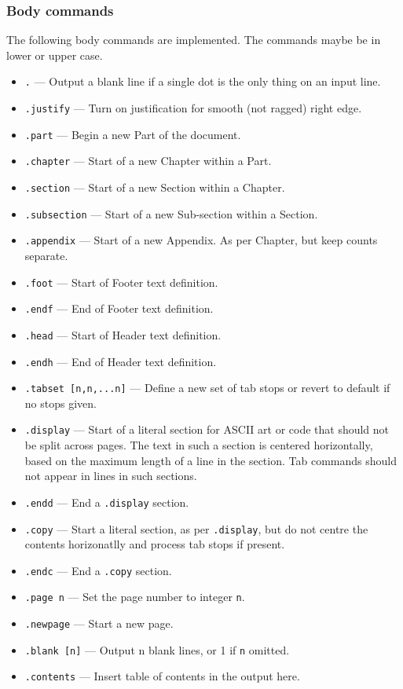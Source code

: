 \documentclass[a4paper,twoside,11pt]{article}
\newcommand{\textttc}[1]{\texttt{\textcolor{OurRed}{#1}}}
\begin{document}
\subsubsection{Body commands}
The following body commands are implemented. The commands maybe be in lower or upper case.
\begin{itemize}
\item \textttc{.} --- Output a blank line if a single dot is the only thing on an input line.
\item \textttc{.justify} --- Turn on justification for smooth (not ragged) right edge.
\item \textttc{.part} --- Begin a new Part of the document.
\item \textttc{.chapter} --- Start of a new Chapter within a Part.
\item \textttc{.section} --- Start of a new Section within a Chapter.
\item \textttc{.subsection} --- Start of a new Sub-section within a Section.
\item \textttc{.appendix} --- Start of a new Appendix. As per Chapter, but keep counts separate.
\item \textttc{.foot} --- Start of Footer text definition.
\item \textttc{.endf} --- End of Footer text definition.
\item \textttc{.head} --- Start of Header text definition.
\item \textttc{.endh} --- End of Header text definition.
\item \textttc{.tabset [n,n,...n]} --- Define a new set of tab stops or revert to default if no stops given.
\item \textttc{.display} --- Start of a literal section for ASCII art or code that should not
  be split across pages. The text in such a section is centered horizontally, based on
  the maximum length of a line in the section. Tab commands
  should not appear in lines in such sections.
\item \textttc{.endd} --- End a \texttt{.display} section.
\item \textttc{.copy} --- Start a literal section, as per \texttt{.display}, but do not centre the contents
  horizonatlly and process tab stops if present.
\item \textttc{.endc} --- End a \texttt{.copy} section.
\item \textttc{.page n} --- Set the page number to integer \texttt{n}.
\item \textttc{.newpage} --- Start a new page.
\item \textttc{.blank [n]} --- Output n blank lines, or 1 if \texttt{n} omitted.
\item \textttc{.contents} --- Insert table of contents in the output here.
\end{itemize}
\end{document}
